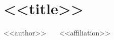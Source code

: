 \documentclass[letterpaper,12pt]{article}
\begin{document}
\section{<<title>>}
\textmd{\small{<<author>>}}~~~\footnotesize{
	<<affiliation>>}
\vspace{-15pt}
\begin{multicols}{2}
\small






\end{multicols}
\end{document}

